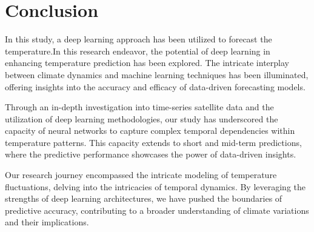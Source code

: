 \documentclass[sn-mathphys,Numbered]{sn-jnl}
\theoremstyle{thmstyleone}
\theoremstyle{thmstyletwo}
\theoremstyle{thmstylethree}
\begin{document}
\section{Conclusion}
In this study, a deep learning approach has been utilized to forecast the temperature.In this research endeavor, the potential of deep learning in enhancing temperature prediction has been explored. The intricate interplay between climate dynamics and machine learning techniques has been illuminated, offering insights into the accuracy and efficacy of data-driven forecasting models.

Through an in-depth investigation into time-series satellite data and the utilization of deep learning methodologies, our study has underscored the capacity of neural networks to capture complex temporal dependencies within temperature patterns. This capacity extends to short and mid-term predictions, where the predictive performance showcases the power of data-driven insights.

Our research journey encompassed the intricate modeling of temperature fluctuations, delving into the intricacies of temporal dynamics. By leveraging the strengths of deep learning architectures, we have pushed the boundaries of predictive accuracy, contributing to a broader understanding of climate variations and their implications.



\end{document}
